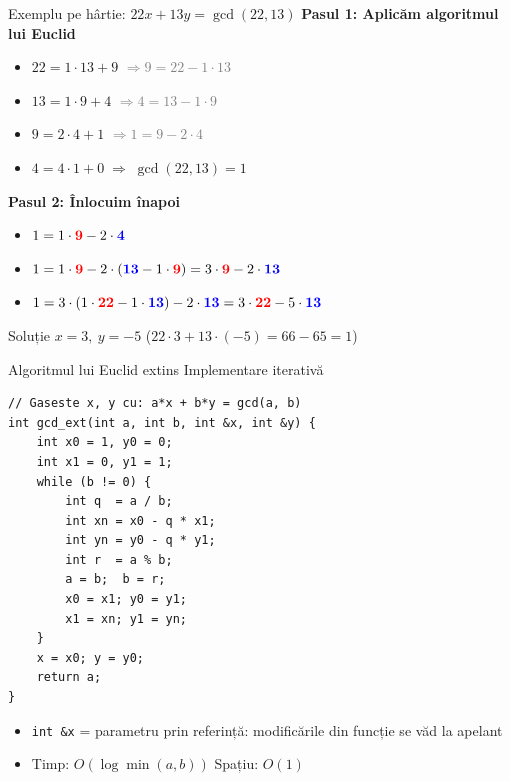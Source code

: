 \documentclass{beamer}
\newcommand{\bred}[1]{\textbf{\textcolor{red}{#1}}}
\newcommand{\bblu}[1]{\textbf{\textcolor{blue}{#1}}}
\begin{document}
\begin{frame}[shrink]{Exemplu pe hârtie: $22x + 13y = \gcd(22, 13)$}
  \textbf{Pasul 1: Aplicăm algoritmul lui Euclid}
  \begin{itemize}
    \item $22 = 1 \cdot 13 + 9$ \hfill {\footnotesize\textcolor{gray}{$\Rightarrow 9 = 22 - 1 \cdot 13$}}
    \item $13 = 1 \cdot 9 + 4$ \hfill {\footnotesize\textcolor{gray}{$\Rightarrow 4 = 13 - 1 \cdot 9$}}
    \item $9 = 2 \cdot 4 + 1$ \hfill {\footnotesize\textcolor{gray}{$\Rightarrow 1 = 9 - 2 \cdot 4$}}
    \item $4 = 4 \cdot 1 + 0 \;\Rightarrow\; \gcd(22, 13) = 1$
  \end{itemize}

  \bigskip
  \textbf{Pasul 2: Înlocuim înapoi}
  \begin{itemize}
    \item $1 = 1 \cdot \bred{9} - 2 \cdot \bblu{4}$
    \item $1 = 1 \cdot \bred{9} - 2 \cdot (\bblu{13} - 1 \cdot \bred{9}) = 3 \cdot \bred{9} - 2 \cdot \bblu{13}$
    \item $1 = 3 \cdot (1 \cdot \bred{22} - 1 \cdot \bblu{13}) - 2 \cdot \bblu{13} = 3 \cdot \bred{22} - 5 \cdot \bblu{13}$
  \end{itemize}
  \bigskip
  \begin{block}{Soluție}
    $x = 3,\ y = -5$ \quad \checkmark \quad ($22 \cdot 3 + 13 \cdot (-5) = 66 - 65 = 1$)
  \end{block}
\end{frame}

\begin{frame}{Algoritmul lui Euclid extins \textemdash{} Implementare iterativă}
  \begin{center}
  \begin{lstlisting}
// Gaseste x, y cu: a*x + b*y = gcd(a, b)
int gcd_ext(int a, int b, int &x, int &y) {
    int x0 = 1, y0 = 0;
    int x1 = 0, y1 = 1;
    while (b != 0) {
        int q  = a / b;
        int xn = x0 - q * x1;
        int yn = y0 - q * y1;
        int r  = a % b;
        a = b;  b = r;
        x0 = x1; y0 = y1;
        x1 = xn; y1 = yn;
    }
    x = x0; y = y0;
    return a;
}
  \end{lstlisting}
  \end{center}
  \begin{itemize}
    \item \lstinline|int &x| = parametru prin referință: modificările din funcție se văd la apelant
    \item Timp: $O(\log \min(a, b))$ \quad Spațiu: $O(1)$
  \end{itemize}
\end{frame}
\end{document}
